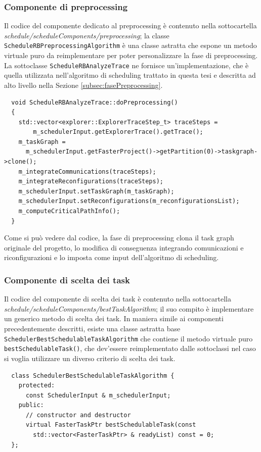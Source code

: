 \subsubsection{Componente di preprocessing}
Il codice del componente dedicato al preprocessing è contenuto nella 
sottocartella \emph{schedule/scheduleComponents/preprocessing}; la classe 
\verb+ScheduleRBPreprocessingAlgorithm+ è una classe astratta che espone un 
metodo virtuale puro da reimplementare per poter personalizzare la fase di 
preprocessing. La sottoclasse \verb+ScheduleRBAnalyzeTrace+ ne fornisce 
un'implementazione, che è quella utilizzata nell'algoritmo di scheduling 
trattato in questa tesi e descritta ad alto livello nella Sezione 
\ref{subsec:fasePreprocessing}.
\newline
\begin{verbatim}
  void ScheduleRBAnalyzeTrace::doPreprocessing()
  {
    std::vector<explorer::ExplorerTraceStep_t> traceSteps = 
        m_schedulerInput.getExplorerTrace().getTrace();
    m_taskGraph = 
      m_schedulerInput.getFasterProject()->getPartition(0)->taskgraph->clone();
    m_integrateCommunications(traceSteps);
    m_integrateReconfigurations(traceSteps);
    m_schedulerInput.setTaskGraph(m_taskGraph);
    m_schedulerInput.setReconfigurations(m_reconfigurationsList);
    m_computeCriticalPathInfo();
  }
\end{verbatim}

Come si può vedere dal codice, la fase di preprocessing clona il task graph 
originale del progetto, lo modifica di conseguenza integrando comunicazioni e 
riconfigurazioni e lo imposta come input dell'algoritmo di scheduling.

\subsubsection{Componente di scelta dei task}
Il codice del componente di scelta dei task è contenuto nella sottocartella 
\emph{schedule/scheduleComponents/bestTaskAlgorithm}; il suo compito è 
implementare un generico metodo di scelta dei task. In maniera simile ai 
componenti precedentemente descritti, esiste una classe astratta base 
\verb+SchedulerBestSchedulableTaskAlgorithm+ che contiene il metodo virtuale 
puro \verb+bestSchedulableTask()+, che dev'essere reimplementato dalle 
sottoclassi nel caso si voglia utilizzare un diverso criterio di scelta dei 
task.
\newline
\begin{verbatim}
  class SchedulerBestSchedulableTaskAlgorithm {
    protected:
      const SchedulerInput & m_schedulerInput;
    public:
      // constructor and destructor
      virtual FasterTaskPtr bestSchedulableTask(const 
        std::vector<FasterTaskPtr> & readyList) const = 0;
  };
\end{verbatim}

